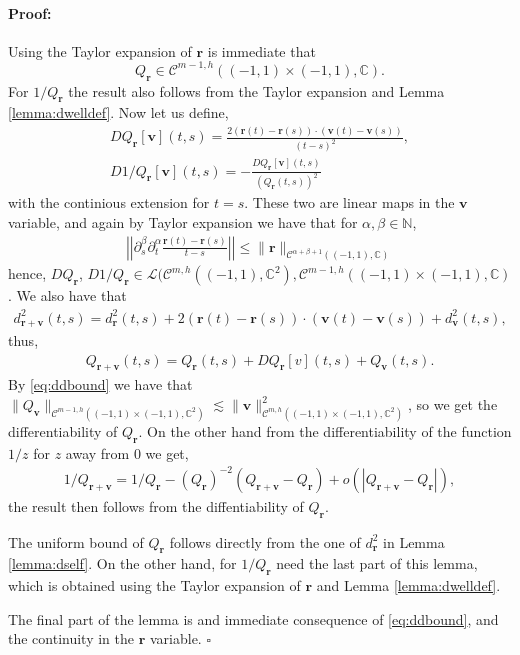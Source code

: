 \documentclass{article}
\newenvironment{proof}{\paragraph{Proof:}}{\hfill$\square$}
\newcommand{\IC}{{\mathbb C}}
\newcommand{\IN}{{\mathbb N}}
\newcommand{\cmspace}[3]{\mathcal{C}^{#1} \left( #2, #3 \right)}
\newcommand{\cmspaceh}[4]{\mathcal{C}^{#1,#2} \left( #3, #4 \right)}
\newcommand{\bh}{\bm{h}}
\newcommand{\bv}{\bm{v}}
\newcommand{\br}{\bm{r}}
\newcommand{\iinterv}{(-1,1)\times(-1,1)}
\begin{document}
\begin{proof}
Using the Taylor expansion of $\br$  is immediate that  $$Q_{\br} \in \cmspaceh{m-1}{h}{(-1,1)\times(-1,1)}{\IC}.$$ For $1/Q_{\br}$ the result also follows from the Taylor expansion and Lemma \ref{lemma:dwelldef}.  Now let us define,
\begin{align*}
DQ_{\br}[\bv](t,s) = \frac{2 (\br(t)-\br(s))\cdot (\bv(t)-\bv(s))}{(t-s)^2}, \\
D1/Q_{\br}[\bv](t,s) = -\frac{DQ_{\br}[\bv](t,s)}{(Q_{\br}(t,s))^2} 
\end{align*}
with the continious extension for $t=s$. These two are linear maps in the $\bv$ variable, and again by Taylor expansion we have that for $\alpha, \beta \in \IN$, 
\begin{align}
\label{eq:ddbound}
\left\vert \left\vert \partial_s^\beta \partial_t^\alpha \frac{\br(t)-\br(s)}{t-s} \right \vert  \right \vert\leq \| \br \|_{\cmspace{\alpha+\beta+1}{(-1,1)}{\IC}}
\end{align}
hence, $DQ_{\br}$, $D1/Q_{\br} \in \mathcal{L}(\cmspaceh{m}{h}{(-1,1)}{\IC^2}
  , \cmspaceh{m-1}{h}{(-1,1)\times(-1,1)}{\IC}$.
We also have that 
\begin{align*}
d_{\br +\bv}^2(t,s) = d^2_{\br}(t,s) + 2 (\br(t) -\br(s))\cdot (\bv(t)-\bv(s)) + d_{\bv}^2(t,s),
\end{align*}
thus, 
\begin{align*}
Q_{\br +\bv}(t,s) = Q_{\br}(t,s) + DQ_{\br}[v](t,s) + Q_{\bv}(t,s).
\end{align*}
By \eqref{eq:ddbound} we have that $\| Q_{\bv}\|_{\cmspaceh{m-1}{h}{\iinterv}{\IC^2}} \lesssim \| \bv\|_{\cmspaceh{m}{h}{\iinterv}{\IC^2}}^2$, so we get the differentiability of $Q_{\br}$. On the other hand from the differentiability of the function $1/z$ for $z$ away from $0$ we get, 
\begin{align*}
1/Q_{\br+\bv} = 1/Q_{\br} - (Q_{\br})^{-2} (Q_{\br+\bv}-Q_{\br}) + o(|Q_{\br+\bv}-Q_{\br}|),
\end{align*}
the result then follows from the diffentiability of $Q_{\br}$.



The uniform bound of $Q_{\br}$ follows directly from the one of $d^2_{\br}$ in Lemma \ref{lemma:dself}. On the other hand, for $1/Q_{\br}$ need the last part of this lemma, which is obtained using the Taylor expansion of $\br$ and Lemma \ref{lemma:dwelldef}.

The final part of the lemma is and immediate consequence of \eqref{eq:ddbound}, and the continuity in the $\br$ variable. 
\end{proof}
\end{document}
